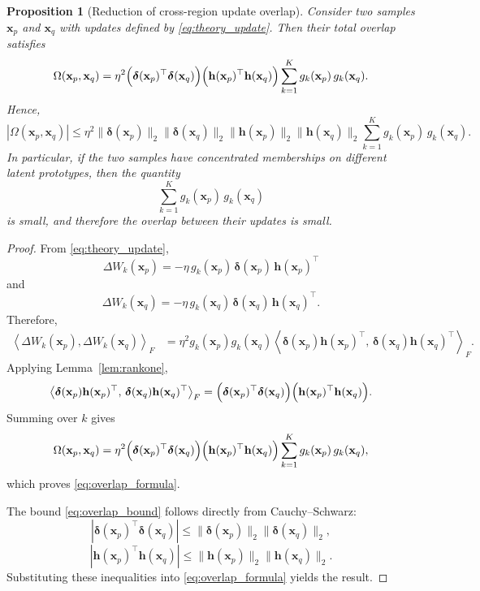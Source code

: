 \documentclass{article}
\newtheorem{prop}[thm]{Proposition}
\theoremstyle{definition}
\theoremstyle{remark}
\begin{document}
\begin{prop}[Reduction of cross-region update overlap]
\label{prop:overlap_reduction}
Consider two samples $\mathbf{x}_p$ and $\mathbf{x}_q$ with updates defined by \eqref{eq:theory_update}. Then their total overlap satisfies
\begin{equation}
\Omega(\mathbf{x}_p,\mathbf{x}_q)
=
\eta^2
\Bigl(\boldsymbol{\delta}(\mathbf{x}_p)^\top \boldsymbol{\delta}(\mathbf{x}_q)\Bigr)
\Bigl(\mathbf{h}(\mathbf{x}_p)^\top \mathbf{h}(\mathbf{x}_q)\Bigr)
\sum_{k=1}^{K} g_k(\mathbf{x}_p)\,g_k(\mathbf{x}_q).
\label{eq:overlap_formula}
\end{equation}
Hence,
\begin{equation}
|\Omega(\mathbf{x}_p,\mathbf{x}_q)|
\le
\eta^2
\|\boldsymbol{\delta}(\mathbf{x}_p)\|_2
\|\boldsymbol{\delta}(\mathbf{x}_q)\|_2
\|\mathbf{h}(\mathbf{x}_p)\|_2
\|\mathbf{h}(\mathbf{x}_q)\|_2
\sum_{k=1}^{K} g_k(\mathbf{x}_p)\,g_k(\mathbf{x}_q).
\label{eq:overlap_bound}
\end{equation}
In particular, if the two samples have concentrated memberships on different latent prototypes, then the quantity
\[
\sum_{k=1}^{K} g_k(\mathbf{x}_p)\,g_k(\mathbf{x}_q)
\]
is small, and therefore the overlap between their updates is small.
\end{prop}

\begin{proof}
From \eqref{eq:theory_update},
\[
\Delta W_k(\mathbf{x}_p)
=
-\eta\, g_k(\mathbf{x}_p)\,\boldsymbol{\delta}(\mathbf{x}_p)\,\mathbf{h}(\mathbf{x}_p)^\top
\]
and
\[
\Delta W_k(\mathbf{x}_q)
=
-\eta\, g_k(\mathbf{x}_q)\,\boldsymbol{\delta}(\mathbf{x}_q)\,\mathbf{h}(\mathbf{x}_q)^\top.
\]
Therefore,
\begin{align*}
\left\langle
\Delta W_k(\mathbf{x}_p),\Delta W_k(\mathbf{x}_q)
\right\rangle_F
&=
\eta^2 g_k(\mathbf{x}_p)g_k(\mathbf{x}_q)
\left\langle
\boldsymbol{\delta}(\mathbf{x}_p)\mathbf{h}(\mathbf{x}_p)^\top,\,
\boldsymbol{\delta}(\mathbf{x}_q)\mathbf{h}(\mathbf{x}_q)^\top
\right\rangle_F.
\end{align*}
Applying Lemma~\ref{lem:rankone},
\[
\left\langle
\boldsymbol{\delta}(\mathbf{x}_p)\mathbf{h}(\mathbf{x}_p)^\top,\,
\boldsymbol{\delta}(\mathbf{x}_q)\mathbf{h}(\mathbf{x}_q)^\top
\right\rangle_F
=
\Bigl(\boldsymbol{\delta}(\mathbf{x}_p)^\top \boldsymbol{\delta}(\mathbf{x}_q)\Bigr)
\Bigl(\mathbf{h}(\mathbf{x}_p)^\top \mathbf{h}(\mathbf{x}_q)\Bigr).
\]
Summing over $k$ gives
\[
\Omega(\mathbf{x}_p,\mathbf{x}_q)
=
\eta^2
\Bigl(\boldsymbol{\delta}(\mathbf{x}_p)^\top \boldsymbol{\delta}(\mathbf{x}_q)\Bigr)
\Bigl(\mathbf{h}(\mathbf{x}_p)^\top \mathbf{h}(\mathbf{x}_q)\Bigr)
\sum_{k=1}^{K} g_k(\mathbf{x}_p)\,g_k(\mathbf{x}_q),
\]
which proves \eqref{eq:overlap_formula}.

The bound \eqref{eq:overlap_bound} follows directly from Cauchy--Schwarz:
\[
|\boldsymbol{\delta}(\mathbf{x}_p)^\top \boldsymbol{\delta}(\mathbf{x}_q)|
\le
\|\boldsymbol{\delta}(\mathbf{x}_p)\|_2 \|\boldsymbol{\delta}(\mathbf{x}_q)\|_2,
\]
\[
|\mathbf{h}(\mathbf{x}_p)^\top \mathbf{h}(\mathbf{x}_q)|
\le
\|\mathbf{h}(\mathbf{x}_p)\|_2 \|\mathbf{h}(\mathbf{x}_q)\|_2.
\]
Substituting these inequalities into \eqref{eq:overlap_formula} yields the result.
\end{proof}
\end{document}
